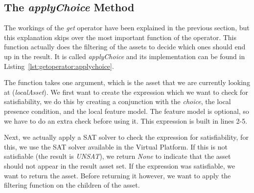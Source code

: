 \subsection{The \emph{applyChoice} Method}
The workings of the \emph{get} operator have been explained in the previous section,
but this explanation skips over the most important function of the operator. This
function actually does the filtering of the assets to decide which ones should end up
in the result. It is called \emph{applyChoice} and its implementation can be found in
Listing~\ref{lst:getoperator:applychoice}.

The function takes one argument, which is the asset that we are currently looking at
(\emph{localAsset}). We first want to create the expression which we want to check for
satisfiability, we do this by creating a conjunction with the \emph{choice}, the local
presence condition, and the local feature model. The feature model is optional, so we
have to do an extra check before using it. This expression is built in lines 2-5.

Next, we actually apply a SAT solver to check the expression for satisfiability, for
this, we use the SAT solver available in the Virtual Platform. If this is not satisfiable
(the result is \emph{UNSAT}), we return \emph{None} to indicate that the asset should
not appear in the result asset set. If the expression was satisfiable, we want to return
the asset. Before returning it however, we want to apply the filtering function on the children
of the asset. 

